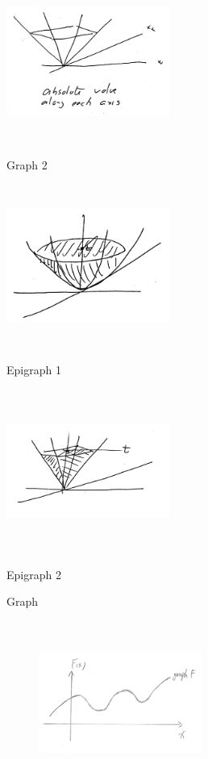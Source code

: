 \begin{marginfigure}
	\centering
	\includegraphics[width=2.1in,height=2.1in]{figures/ch02/p48-2.jpg}
	\caption{Graph 2} 
\end{marginfigure}

\begin{marginfigure}
	\centering
	\includegraphics[width=2.1in,height=2.1in]{figures/ch02/p48-3.jpg}
	\caption{Epigraph 1} 
\end{marginfigure}

\begin{marginfigure}
	\centering
	\includegraphics[width=2.1in,height=2.1in]{figures/ch02/p48-4.jpg}
	\caption{Epigraph 2} 
\end{marginfigure}


Graph
\begin{figure}
	\centering
	\includegraphics[width=2.1in,height=2.1in]{figures/ch02/p47-1.jpg}
	\label{fig:graph} 
\end{figure}

